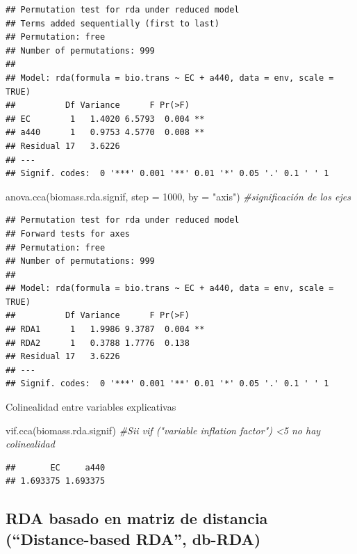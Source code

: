 \documentclass[
]{book}
\newenvironment{Shaded}{\begin{snugshade}}{\end{snugshade}}
\newcommand{\AttributeTok}[1]{\textcolor[rgb]{0.77,0.63,0.00}{#1}}
\newcommand{\CommentTok}[1]{\textcolor[rgb]{0.56,0.35,0.01}{\textit{#1}}}
\newcommand{\DecValTok}[1]{\textcolor[rgb]{0.00,0.00,0.81}{#1}}
\newcommand{\FunctionTok}[1]{\textcolor[rgb]{0.00,0.00,0.00}{#1}}
\newcommand{\NormalTok}[1]{#1}
\newcommand{\StringTok}[1]{\textcolor[rgb]{0.31,0.60,0.02}{#1}}
\begin{document}
\begin{verbatim}
## Permutation test for rda under reduced model
## Terms added sequentially (first to last)
## Permutation: free
## Number of permutations: 999
## 
## Model: rda(formula = bio.trans ~ EC + a440, data = env, scale = TRUE)
##          Df Variance      F Pr(>F)   
## EC        1   1.4020 6.5793  0.004 **
## a440      1   0.9753 4.5770  0.008 **
## Residual 17   3.6226                 
## ---
## Signif. codes:  0 '***' 0.001 '**' 0.01 '*' 0.05 '.' 0.1 ' ' 1
\end{verbatim}

\begin{Shaded}
\begin{Highlighting}[]
\FunctionTok{anova.cca}\NormalTok{(biomass.rda.signif, }\AttributeTok{step =} \DecValTok{1000}\NormalTok{, }\AttributeTok{by =} \StringTok{"axis"}\NormalTok{) }\CommentTok{\#significación de los ejes}
\end{Highlighting}
\end{Shaded}

\begin{verbatim}
## Permutation test for rda under reduced model
## Forward tests for axes
## Permutation: free
## Number of permutations: 999
## 
## Model: rda(formula = bio.trans ~ EC + a440, data = env, scale = TRUE)
##          Df Variance      F Pr(>F)   
## RDA1      1   1.9986 9.3787  0.004 **
## RDA2      1   0.3788 1.7776  0.138   
## Residual 17   3.6226                 
## ---
## Signif. codes:  0 '***' 0.001 '**' 0.01 '*' 0.05 '.' 0.1 ' ' 1
\end{verbatim}

Colinealidad entre variables explicativas

\begin{Shaded}
\begin{Highlighting}[]
\FunctionTok{vif.cca}\NormalTok{(biomass.rda.signif) }\CommentTok{\#Sii vif ("variable inflation factor") \textless{}5 no hay colinealidad}
\end{Highlighting}
\end{Shaded}

\begin{verbatim}
##       EC     a440 
## 1.693375 1.693375
\end{verbatim}

\hypertarget{rda-basado-en-matriz-de-distancia-distance-based-rda-db-rda}{%
\subsection{RDA basado en matriz de distancia (``Distance-based RDA'', db-RDA)}\label{rda-basado-en-matriz-de-distancia-distance-based-rda-db-rda}}
\end{document}

